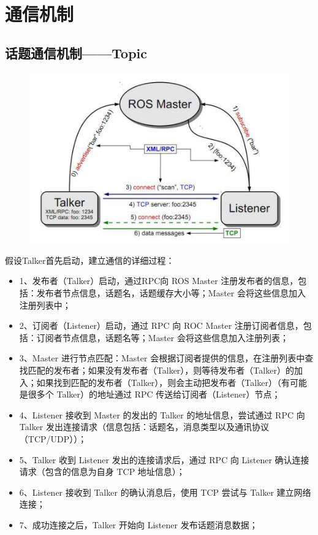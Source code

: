 \documentclass[9pt, oneside]{book}
\begin{document}
\section{通信机制}

\subsection{话题通信机制——Topic}

\begin{figure}[H]
    \centering
    \includegraphics[width=0.7\linewidth]{image/话题通信机制.jpg}
\end{figure}

假设Talker首先启动，建立通信的详细过程：

\begin{itemize}
    \item 1、发布者（Talker）启动，通过RPC向 ROS Master 注册发布者的信息，包括：发布者节点信息，话题名，话题缓存大小等；Master 会将这些信息加入注册列表中；
    \item 2、订阅者（Listener）启动，通过 RPC 向 ROC Master 注册订阅者信息，包括：订阅者节点信息，话题名等；Master 会将这些信息加入注册列表；
    \item 3、Master 进行节点匹配：Master 会根据订阅者提供的信息，在注册列表中查找匹配的发布者；如果没有发布者（Talker），则等待发布者（Talker）的加入；如果找到匹配的发布者（Talker），则会主动把发布者（Talker）（有可能是很多个 Talker）的地址通过 RPC 传送给订阅者（Listener）节点；
    \item 4、Listener 接收到 Master 的发出的 Talker 的地址信息，尝试通过 RPC 向 Talker 发出连接请求（信息包括：话题名，消息类型以及通讯协议（TCP/UDP））；
    \item 5、Talker 收到 Listener 发出的连接请求后，通过 RPC 向 Listener 确认连接请求（包含的信息为自身 TCP 地址信息）；
    \item 6、Listener 接收到 Talker 的确认消息后，使用 TCP 尝试与 Talker 建立网络连接；
    \item 7、成功连接之后，Talker 开始向 Listener 发布话题消息数据；
\end{itemize}
\end{document}
